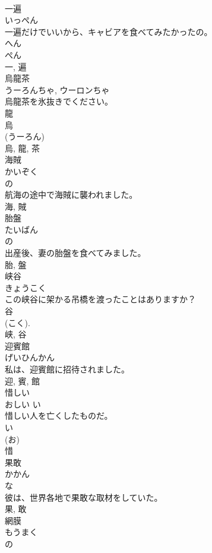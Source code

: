 \documentclass[8pt]{extreport}
\begin{document}
\begin{CJK}{UTF8}{min}
\\	一遍	
\\	いっぺん	
\\	一遍だけでいいから、キャビアを食べてみたかったの。	
\\	へん 
\\	ぺん 
\\	一, 遍	
\\	烏龍茶	
\\	うーろんちゃ, ウーロンちゃ	
\\	烏龍茶を氷抜きでください。	
\\	龍 
\\	烏 
\\	(うーろん) 
\\	烏, 龍, 茶	
\\	海賊	
\\	かいぞく	
\\	の 
\\	航海の途中で海賊に襲われました。	
\\	海, 賊	
\\	胎盤	
\\	たいばん	
\\	の 
\\	出産後、妻の胎盤を食べてみました。	
\\	胎, 盤	
\\	峡谷	
\\	きょうこく	
\\	この峡谷に架かる吊橋を渡ったことはありますか？	
\\	谷 
\\	(こく). 
\\	峡, 谷	
\\	迎賓館	
\\	げいひんかん	
\\	私は、迎賓館に招待されました。	
\\	迎, 賓, 館	
\\	惜しい	
\\	おしい	い 
\\	惜しい人を亡くしたものだ。	
\\	い 
\\	(お) 
\\	惜	
\\	果敢	
\\	かかん	
\\	な 
\\	彼は、世界各地で果敢な取材をしていた。	
\\	果, 敢	
\\	網膜	
\\	もうまく	
\\	の 

\end{CJK}
\end{document}
